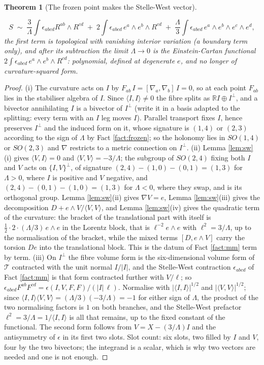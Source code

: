 \documentclass[11pt]{article}
\newtheorem{theorem}{Theorem}[section]
\theoremstyle{definition}
\newcommand{\R}{\mathbb{R}}
\newcommand{\ip}[2]{\langle #1, #2\rangle}
\begin{document}
\begin{theorem}[The frozen point makes the Stelle-West vector]
\begin{enumerate}
\[
S \;\sim\; \frac{3}{\Lambda}\int \epsilon_{abcd}R^{ab}\wedge R^{cd} \;+\; 2\int \epsilon_{abcd}\,e^a\wedge e^b\wedge R^{cd} \;+\; \frac{\Lambda}{3}\int \epsilon_{abcd}\,e^a\wedge e^b\wedge e^c\wedge e^d ,
\]
the first term is topological with vanishing interior variation (a boundary term only), and after its subtraction the limit $\Lambda \to 0$ is the Einstein-Cartan functional $2\int\epsilon_{abcd}\,e^a\wedge e^b\wedge R^{cd}$: polynomial, defined at degenerate $e$, and no longer of curvature-squared form.
\end{enumerate}
\end{theorem}

\begin{proof}
(i) The curvature acts on $I$ by $F_{ab}\,I = [\nabla_a, \nabla_b]\,I = 0$, so at each point $F_{ab}$ lies in the stabiliser algebra of $I$. Since $\ip{I}{I} \neq 0$ the fibre splits as $\R I \oplus I^\perp$, and a bivector annihilating $I$ is a bivector of $I^\perp$ (write it in a basis adapted to the splitting: every term with an $I$ leg moves $I$). Parallel transport fixes $I$, hence preserves $I^\perp$ and the induced form on it, whose signature is $(1,4)$ or $(2,3)$ according to the sign of $\Lambda$ by Fact \ref{fact:frozen}; so the holonomy lies in $SO(1,4)$ or $SO(2,3)$ and $\nabla$ restricts to a metric connection on $I^\perp$.
(ii) Lemma \ref{lem:sw}(i) gives $\ip{V}{I} = 0$ and $\ip{V}{V} = -3/\Lambda$; the subgroup of $SO(2,4)$ fixing both $I$ and $V$ acts on $\{I,V\}^\perp$, of signature $(2,4) - (1,0) - (0,1) = (1,3)$ for $\Lambda > 0$, where $I$ is positive and $V$ negative, and $(2,4) - (0,1) - (1,0) = (1,3)$ for $\Lambda < 0$, where they swap, and is its orthogonal group. Lemma \ref{lem:sw}(ii) gives $\nabla V = e$, Lemma \ref{lem:sw}(iii) gives the decomposition $D + e\wedge V/\ip{V}{V}$, and Lemma \ref{lem:sw}(iv) gives the quadratic term of the curvature: the bracket of the translational part with itself is $\tfrac12\cdot 2\cdot(\Lambda/3)\,e\wedge e$ in the Lorentz block, that is $\ell^{-2}e\wedge e$ with $\ell^2 = 3/\Lambda$, up to the normalisation of the bracket, while the mixed terms $[D, e\wedge V]$ carry the torsion $De$ into the translational block. This is the datum of Fact \ref{fact:mm} term by term.
(iii) On $I^\perp$ the fibre volume form is the six-dimensional volume form of $\mathcal{T}$ contracted with the unit normal $I/|I|$, and the Stelle-West contraction $\epsilon_{abcd}$ of Fact \ref{fact:mm} is that form contracted further with $V/\ell$; so $\epsilon_{abcd}F^{ab}F^{cd} = \epsilon(I, V, F, F)/(|I|\,\ell)$. Normalise with $|\ip{I}{I}|^{1/2}$ and $|\ip{V}{V}|^{1/2}$; since $\ip{I}{I}\ip{V}{V} = (\Lambda/3)(-3/\Lambda) = -1$ for either sign of $\Lambda$, the product of the two normalising factors is $1$ on both branches, and the Stelle-West prefactor $\ell^2 = 3/\Lambda = 1/\ip{I}{I}$ is all that remains, up to the fixed constant of the functional. The second form follows from $V = X - (3/\Lambda)I$ and the antisymmetry of $\epsilon$ in its first two slots. Slot count: six slots, two filled by $I$ and $V$, four by the two bivectors; the integrand is a scalar, which is why two vectors are needed and one is not enough.

\end{proof}
\end{document}
